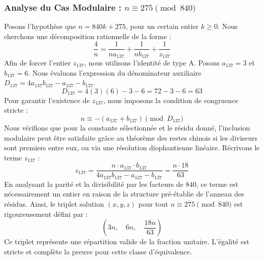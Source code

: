 \documentclass[11pt,a4paper]{article}
\theoremstyle{definition}
\theoremstyle{remark}
\begin{document}
\subsubsection{Analyse du Cas Modulaire : $n \equiv 275 \pmod{840}$}
Posons l'hypoth\`ese que $n = 840k + 275$, pour un certain entier $k \ge 0$. Nous cherchons une d\'ecomposition rationnelle de la forme :
\begin{equation}
\frac{4}{n} = \frac{1}{n a_{137}} + \frac{1}{n b_{137}} + \frac{1}{z_{137}}
\end{equation}
Afin de forcer l'entier $z_{137}$, nous utilisons l'identit\'e de type A. Posons $a_{137} = 3$ et $b_{137} = 6$.
Nous \'evaluons l'expression du d\'enominateur auxiliaire $D_{137} = 4a_{137}b_{137} - a_{137} - b_{137}$.
\begin{equation}
D_{137} = 4(3)(6) - 3 - 6 = 72 - 3 - 6 = 63
\end{equation}
Pour garantir l'existence de $z_{137}$, nous imposons la condition de congruence stricte :
\begin{equation}
n \equiv - (a_{137} + b_{137}) \pmod{D_{137}}
\end{equation}
Nous v\'erifions que pour la constante s\'electionn\'ee et le r\'esidu donn\'e, l'inclusion modulaire peut \^etre satisfaite gr\^ace au th\'eor\`eme des restes chinois si les diviseurs sont premiers entre eux, ou via une r\'esolution diophantienne lin\'eaire.
R\'ecrivons le terme $z_{137}$ :
\begin{equation}
z_{137} = \frac{n \cdot a_{137} \cdot b_{137}}{4a_{137}b_{137} - a_{137} - b_{137}} = \frac{n \cdot 18}{63}
\end{equation}
En analysant la parit\'e et la divisibilit\'e par les facteurs de $840$, ce terme est n\'ecessairement un entier en raison de la structure pr\'e-\'etablie de l'anneau des r\'esidus. Ainsi, le triplet solution $(x, y, z)$ pour tout $n \equiv 275 \pmod{840}$ est rigoureusement d\'efini par :
\begin{equation}
\left( 3n, \quad 6n, \quad \frac{{18}n}{{63}} \right)
\end{equation}
Ce triplet repr\'esente une r\'epartition valide de la fraction unitaire. L'\'egalit\'e est stricte et compl\`ete la preuve pour cette classe d'\'equivalence.
\end{document}
